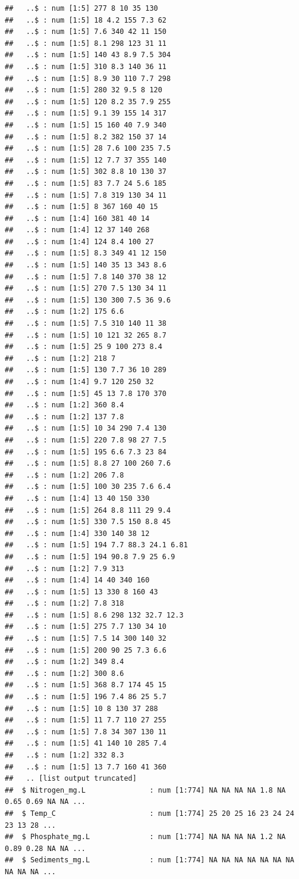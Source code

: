 \documentclass[
  12pt,
]{article}
\begin{document}
\begin{verbatim}
##   ..$ : num [1:5] 277 8 10 35 130
##   ..$ : num [1:5] 18 4.2 155 7.3 62
##   ..$ : num [1:5] 7.6 340 42 11 150
##   ..$ : num [1:5] 8.1 298 123 31 11
##   ..$ : num [1:5] 140 43 8.9 7.5 304
##   ..$ : num [1:5] 310 8.3 140 36 11
##   ..$ : num [1:5] 8.9 30 110 7.7 298
##   ..$ : num [1:5] 280 32 9.5 8 120
##   ..$ : num [1:5] 120 8.2 35 7.9 255
##   ..$ : num [1:5] 9.1 39 155 14 317
##   ..$ : num [1:5] 15 160 40 7.9 340
##   ..$ : num [1:5] 8.2 382 150 37 14
##   ..$ : num [1:5] 28 7.6 100 235 7.5
##   ..$ : num [1:5] 12 7.7 37 355 140
##   ..$ : num [1:5] 302 8.8 10 130 37
##   ..$ : num [1:5] 83 7.7 24 5.6 185
##   ..$ : num [1:5] 7.8 319 130 34 11
##   ..$ : num [1:5] 8 367 160 40 15
##   ..$ : num [1:4] 160 381 40 14
##   ..$ : num [1:4] 12 37 140 268
##   ..$ : num [1:4] 124 8.4 100 27
##   ..$ : num [1:5] 8.3 349 41 12 150
##   ..$ : num [1:5] 140 35 13 343 8.6
##   ..$ : num [1:5] 7.8 140 370 38 12
##   ..$ : num [1:5] 270 7.5 130 34 11
##   ..$ : num [1:5] 130 300 7.5 36 9.6
##   ..$ : num [1:2] 175 6.6
##   ..$ : num [1:5] 7.5 310 140 11 38
##   ..$ : num [1:5] 10 121 32 265 8.7
##   ..$ : num [1:5] 25 9 100 273 8.4
##   ..$ : num [1:2] 218 7
##   ..$ : num [1:5] 130 7.7 36 10 289
##   ..$ : num [1:4] 9.7 120 250 32
##   ..$ : num [1:5] 45 13 7.8 170 370
##   ..$ : num [1:2] 360 8.4
##   ..$ : num [1:2] 137 7.8
##   ..$ : num [1:5] 10 34 290 7.4 130
##   ..$ : num [1:5] 220 7.8 98 27 7.5
##   ..$ : num [1:5] 195 6.6 7.3 23 84
##   ..$ : num [1:5] 8.8 27 100 260 7.6
##   ..$ : num [1:2] 206 7.8
##   ..$ : num [1:5] 100 30 235 7.6 6.4
##   ..$ : num [1:4] 13 40 150 330
##   ..$ : num [1:5] 264 8.8 111 29 9.4
##   ..$ : num [1:5] 330 7.5 150 8.8 45
##   ..$ : num [1:4] 330 140 38 12
##   ..$ : num [1:5] 194 7.7 88.3 24.1 6.81
##   ..$ : num [1:5] 194 90.8 7.9 25 6.9
##   ..$ : num [1:2] 7.9 313
##   ..$ : num [1:4] 14 40 340 160
##   ..$ : num [1:5] 13 330 8 160 43
##   ..$ : num [1:2] 7.8 318
##   ..$ : num [1:5] 8.6 298 132 32.7 12.3
##   ..$ : num [1:5] 275 7.7 130 34 10
##   ..$ : num [1:5] 7.5 14 300 140 32
##   ..$ : num [1:5] 200 90 25 7.3 6.6
##   ..$ : num [1:2] 349 8.4
##   ..$ : num [1:2] 300 8.6
##   ..$ : num [1:5] 368 8.7 174 45 15
##   ..$ : num [1:5] 196 7.4 86 25 5.7
##   ..$ : num [1:5] 10 8 130 37 288
##   ..$ : num [1:5] 11 7.7 110 27 255
##   ..$ : num [1:5] 7.8 34 307 130 11
##   ..$ : num [1:5] 41 140 10 285 7.4
##   ..$ : num [1:2] 332 8.3
##   ..$ : num [1:5] 13 7.7 160 41 360
##   .. [list output truncated]
##  $ Nitrogen_mg.L               : num [1:774] NA NA NA NA 1.8 NA 0.65 0.69 NA NA ...
##  $ Temp_C                      : num [1:774] 25 20 25 16 23 24 24 23 13 28 ...
##  $ Phosphate_mg.L              : num [1:774] NA NA NA NA 1.2 NA 0.89 0.28 NA NA ...
##  $ Sediments_mg.L              : num [1:774] NA NA NA NA NA NA NA NA NA NA ...
\end{verbatim}
\end{document}
